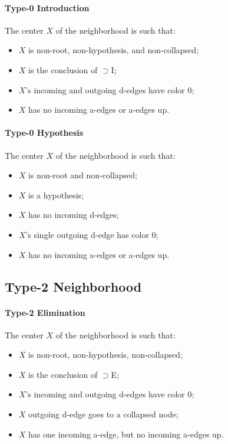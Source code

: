 \documentclass[12pt]{article}
\begin{document}
\paragraph{Type-0 Introduction}
The center $X$ of the neighborhood is such that:
\begin{itemize}
\item $X$ is non-root, non-hypothesis, and non-collapsed;
\item $X$ is the conclusion of $⊃$I;
\item $X$'s incoming and outgoing d-edges have color 0;
\item $X$ has no incoming a-edges or a-edges up.
\end{itemize}

\paragraph{Type-0 Hypothesis}
The center $X$ of the neighborhood is such that:
\begin{itemize}
\item $X$ is non-root and non-collapsed;
\item $X$ is a hypothesis;
\item $X$ has no incoming d-edges;
\item $X$'s single outgoing d-edge has color 0;
\item $X$ has no incoming a-edges or a-edges up.
\end{itemize}

\subsection{Type-2 Neighborhood}

\paragraph{Type-2 Elimination}
The center $X$ of the neighborhood is such that:
\begin{itemize}
\item $X$ is non-root, non-hypothesis, non-collapsed;
\item $X$ is the conclusion of $⊃$E;
\item $X$'s incoming and outgoing d-edges have color 0;
\item $X$ outgoing d-edge goes to a collapsed node;
\item $X$ has one incoming a-edge, but no incoming a-edges up.
\end{itemize}
\end{document}
